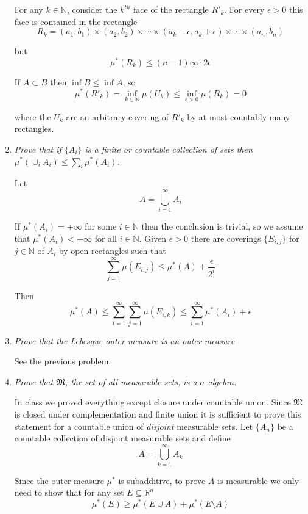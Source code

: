 \documentclass[11pt]{article}
\begin{document}
\begin{enumerate}
For any $k \in \mathbb{N}$, consider the $k^{th}$ face of the rectangle $R'_k$.  For every $\epsilon > 0$ this face is contained in the rectangle
\[
R_k = (a_1,b_1) \times (a_2, b_2) \times \cdots \times (a_k - \epsilon, a_k+\epsilon) \times \cdots \times (a_n, b_n)
\]

but
\[
\mu^\ast(R_k) \leq (n-1)\infty \cdot 2\epsilon
\]

If $A \subset B$ then $\inf B \leq \inf A$, so
\[
\mu^\ast(R'_k) = \inf_{k \in \mathbb{N}} \mu(U_k) \leq \inf_{\epsilon > 0} \mu(R_k) = 0
\]

where the $U_k$ are an arbitrary covering of $R'_k$ by at most countably many rectangles.

\item \emph{Prove that if $\{A_i\}$ is a finite or countable collection of sets then $\mu^\ast(\cup_iA_i) \leq \sum_i \mu^\ast(A_i)$.}

Let
\[
A = \bigcup_{i=1}^\infty A_i
\]

If $\mu^\ast(A_i) = +\infty$ for some $i \in \mathbb{N}$ then the conclusion is trivial, so we assume that $\mu^\ast(A_i) < +\infty$ for all $i \in \mathbb{N}$.  Given $\epsilon > 0$ there are coverings $\{E_{i,j}\}$ for $j \in \mathbb{N}$ of $A_i$ by open rectangles such that
\[
\sum_{j=1}^\infty \mu(E_{i,j}) \leq \mu^\ast(A) + \frac{\epsilon}{2^i}
\]

Then
\[
\mu^\ast(A) \leq \sum_{i=1}^\infty \sum_{j=1}^\infty \mu(E_{i,k}) \leq \sum_{i=1}^\infty \mu^\ast(A_i) + \epsilon
\]

\item \emph{Prove that the Lebesgue outer measure is an outer measure}

See the previous problem.

\item \emph{Prove that $\mathfrak{M}$, the set of all measurable sets, is a $\sigma$-algebra.}

In class we proved everything except closure under countable union.  Since $\mathfrak{M}$ is closed under complementation and finite union it is sufficient to prove this statement for a countable union of \emph{disjoint} measurable sets.  Let $\{A_n\}$ be a countable collection of disjoint measurable sets and define
\[
A = \bigcup_{k=1}^\infty A_k
\]

Since the outer measure $\mu^\ast$ is subadditive, to prove $A$ is measurable we only need to show that for any set $E \subseteq \mathbb{R}^n$
\[
\mu^\ast(E) \geq \mu^\ast(E \cup A) + \mu^\ast(E \setminus A)
\]


\end{enumerate}
\end{document}
